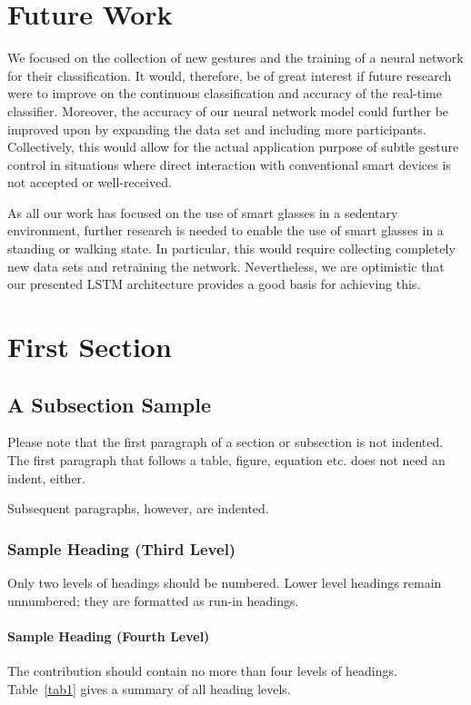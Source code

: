 \documentclass[runningheads]{llncs}
\begin{document}
\section{Future Work}
We focused on the collection of new gestures and the training of a neural network for their classification. It would, therefore, be of great interest if future research were to improve on the continuous classification and accuracy of the real-time classifier. Moreover, the accuracy of our neural network model could further be improved upon by expanding the data set and including more participants. Collectively, this would allow for the actual application purpose of subtle gesture control in situations where direct interaction with conventional smart devices is not accepted or well-received.

As all our work has focused on the use of smart glasses in a sedentary environment, further research is needed to enable the use of smart glasses in a standing or walking state. In particular, this would require collecting completely new data sets and retraining the network. Nevertheless, we are optimistic that our presented LSTM architecture provides a good basis for achieving this.


\section{First Section}
\subsection{A Subsection Sample}
Please note that the first paragraph of a section or subsection is
not indented. The first paragraph that follows a table, figure,
equation etc. does not need an indent, either.

Subsequent paragraphs, however, are indented.

\subsubsection{Sample Heading (Third Level)} Only two levels of
headings should be numbered. Lower level headings remain unnumbered;
they are formatted as run-in headings.

\paragraph{Sample Heading (Fourth Level)}
The contribution should contain no more than four levels of
headings. Table~\ref{tab1} gives a summary of all heading levels.
\end{document}
